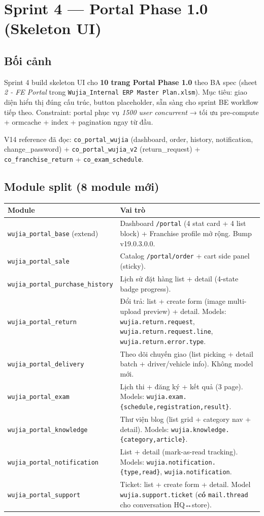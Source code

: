 \chapter{Sprint 4 --- Portal Phase 1.0 (Skeleton UI)}

\section{Bối cảnh}

Sprint 4 build skeleton UI cho \textbf{10 trang Portal Phase 1.0} theo BA spec (sheet \emph{2 - FE Portal} trong \texttt{Wujia\_Internal ERP Master Plan.xlsm}). Mục tiêu: giao diện hiển thị đúng cấu trúc, button placeholder, sẵn sàng cho sprint BE workflow tiếp theo. Constraint: portal phục vụ \emph{1500 user concurrent} → tối ưu pre-compute + ormcache + index + pagination ngay từ đầu.

V14 reference đã đọc: \texttt{co\_portal\_wujia} (dashboard, order, history, notification, change\_password) + \texttt{co\_portal\_wujia\_v2} (return\_request) + \texttt{co\_franchise\_return} + \texttt{co\_exam\_schedule}.

\section{Module split (8 module mới)}

\begin{longtable}{p{4.5cm} p{8.5cm}}
\toprule
\textbf{Module} & \textbf{Vai trò} \\
\midrule
\endhead
\texttt{wujia\_portal\_base} (extend) & Dashboard \texttt{/portal} (4 stat card + 4 list block) + Franchise profile mở rộng. Bump v19.0.3.0.0. \\
\texttt{wujia\_portal\_sale} & Catalog \texttt{/portal/order} + cart side panel (sticky). \\
\texttt{wujia\_portal\_purchase\_history} & Lịch sử đặt hàng list + detail (4-state badge progress). \\
\texttt{wujia\_portal\_return} & Đổi trả: list + create form (image multi-upload preview) + detail. Models: \texttt{wujia.return.request}, \texttt{wujia.return.request.line}, \texttt{wujia.return.error.type}. \\
\texttt{wujia\_portal\_delivery} & Theo dõi chuyến giao (list picking + detail batch + driver/vehicle info). Không model mới. \\
\texttt{wujia\_portal\_exam} & Lịch thi + đăng ký + kết quả (3 page). Models: \texttt{wujia.exam.\{schedule,registration,result\}}. \\
\texttt{wujia\_portal\_knowledge} & Thư viện blog (list grid + category nav + detail). Models: \texttt{wujia.knowledge.\{category,article\}}. \\
\texttt{wujia\_portal\_notification} & List + detail (mark-as-read tracking). Models: \texttt{wujia.notification.\{type,read\}}, \texttt{wujia.notification}. \\
\texttt{wujia\_portal\_support} & Ticket: list + create form + detail. Model \texttt{wujia.support.ticket} (\textbf{có} \texttt{mail.thread} cho conversation HQ↔store). \\
\bottomrule
\end{longtable}

